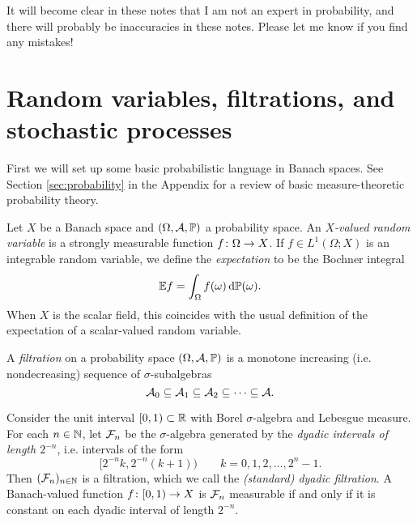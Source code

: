 \begin{rmk}
  It will become clear in these notes that I am not an expert in probability, and there will probably be inaccuracies in these notes.
  Please let me know if you find any mistakes!
\end{rmk}

\section{Random variables, filtrations, and stochastic processes}

First we will set up some basic probabilistic language in Banach spaces.
See Section \ref{sec:probability} in the Appendix for a review of basic measure-theoretic probability theory.

\begin{defn}
  Let $X$ be a Banach space and $(\Omega,\mathcal{A},\mathbb{P})$ a probability space.
  An \emph{$X$-valued random variable} is a strongly measurable function $f \colon \Omega \rightarrow X$.
  If $f \in L^1(\Omega;X)$ is an integrable random variable, we define the \emph{expectation} to be the Bochner integral
  \begin{equation*}
    \mathbb{E} f = \int_{\Omega} f(\omega) \, \mathrm{d}\mathbb{P}(\omega).
  \end{equation*}
  When $X$ is the scalar field, this coincides with the usual definition of the expectation of a scalar-valued random variable.
\end{defn}

\begin{defn}
  A \emph{filtration} on a probability space $(\Omega,\mathcal{A},\mathbb{P})$ is a monotone increasing (i.e. nondecreasing) sequence of $\sigma$-subalgebras
  \begin{equation*}
    \mathcal{A}_0 \subseteq \mathcal{A}_1 \subseteq \mathcal{A}_2 \subseteq \cdots \subseteq \mathcal{A}.
  \end{equation*}
\end{defn}

\begin{example}\label{eg:dyadic-filtration}
  Consider the unit interval $[0,1) \subset \mathbb{R}$ with Borel $\sigma$-algebra and Lebesgue measure.
  For each $n \in \mathbb{N}$, let $\mathcal{F}_n$ be the $\sigma$-algebra generated by the \emph{dyadic intervals of length $2^{-n}$}, i.e. intervals of the form
  \begin{equation*}
    [2^{-n}k, 2^{-n}(k+1)) \qquad k = 0, 1, 2, \ldots, 2^{n}- 1.
  \end{equation*}
  Then $(\mathcal{F}_n)_{n \in \mathbb{N}}$ is a filtration, which we call the \emph{(standard) dyadic filtration}.
  A Banach-valued function $f \colon [0,1) \rightarrow X$ is $\mathcal{F}_n$ measurable if and only if it is constant on each dyadic interval of length $2^{-n}$.  
\end{example}

